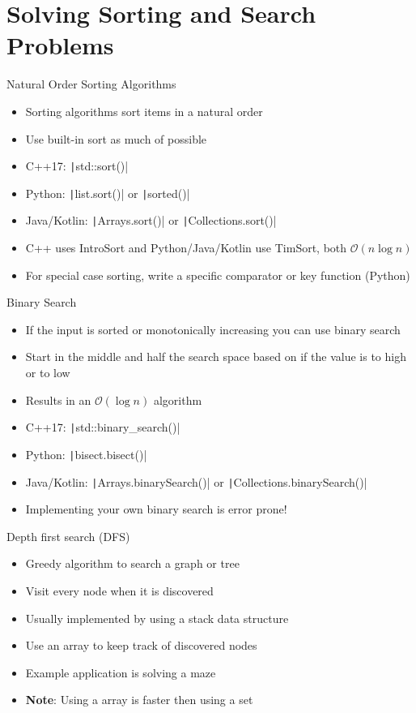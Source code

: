 \documentclass[11pt,pdf, aspectratio=169]{beamer}
\begin{document}
  \section{Solving Sorting and Search Problems}
  \begin{frame}{Natural Order Sorting Algorithms}
    \begin{itemize}
      \item Sorting algorithms sort items in a natural order
      \item Use built-in sort as much of possible
      \item C++17: \texttt|std::sort()|
      \item Python: \texttt|list.sort()| or \texttt|sorted()|
      \item Java/Kotlin: \texttt|Arrays.sort()| or \texttt|Collections.sort()|
      \item C++ uses IntroSort and Python/Java/Kotlin use TimSort, both $\mathcal{O}(n\log{}n)$
      \item For special case sorting, write a specific comparator or key function (Python)
    \end{itemize}
  \end{frame}
  \begin{frame}{Binary Search}
    \begin{itemize}
      \item If the input is sorted or monotonically increasing you can use binary search
      \item Start in the middle and half the search space based on if the value is to high or to low
      \item Results in an $\mathcal{O}(\log{}n)$ algorithm
      \item C++17: \texttt|std::binary_search()|
      \item Python: \texttt|bisect.bisect()|
      \item Java/Kotlin: \texttt|Arrays.binarySearch()| or \texttt|Collections.binarySearch()|
      \item Implementing your own binary search is error prone!
    \end{itemize}
  \end{frame}
  \begin{frame}{Depth first search (DFS)}
    \begin{itemize}
      \item Greedy algorithm to search a graph or tree
      \item Visit every node when it is discovered
      \item Usually implemented by using a stack data structure
      \item Use an array to keep track of discovered nodes
      \item Example application is solving a maze
      \item \textbf{Note}: Using a array is faster then using a set
    \end{itemize}
  \end{frame}
\end{document}
